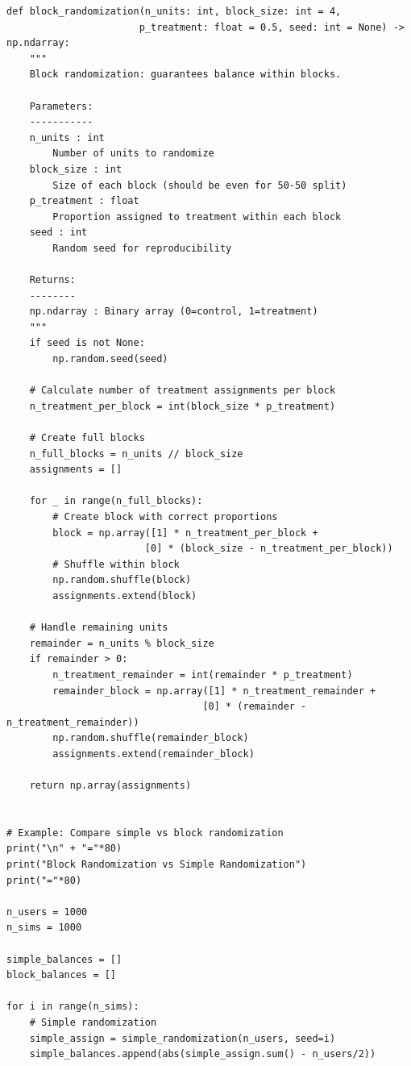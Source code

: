 \lstset{language=Python, caption=Block Randomization Implementation, label=lst:block_random}
\begin{lstlisting}
def block_randomization(n_units: int, block_size: int = 4,
                       p_treatment: float = 0.5, seed: int = None) -> np.ndarray:
    """
    Block randomization: guarantees balance within blocks.

    Parameters:
    -----------
    n_units : int
        Number of units to randomize
    block_size : int
        Size of each block (should be even for 50-50 split)
    p_treatment : float
        Proportion assigned to treatment within each block
    seed : int
        Random seed for reproducibility

    Returns:
    --------
    np.ndarray : Binary array (0=control, 1=treatment)
    """
    if seed is not None:
        np.random.seed(seed)

    # Calculate number of treatment assignments per block
    n_treatment_per_block = int(block_size * p_treatment)

    # Create full blocks
    n_full_blocks = n_units // block_size
    assignments = []

    for _ in range(n_full_blocks):
        # Create block with correct proportions
        block = np.array([1] * n_treatment_per_block +
                        [0] * (block_size - n_treatment_per_block))
        # Shuffle within block
        np.random.shuffle(block)
        assignments.extend(block)

    # Handle remaining units
    remainder = n_units % block_size
    if remainder > 0:
        n_treatment_remainder = int(remainder * p_treatment)
        remainder_block = np.array([1] * n_treatment_remainder +
                                  [0] * (remainder - n_treatment_remainder))
        np.random.shuffle(remainder_block)
        assignments.extend(remainder_block)

    return np.array(assignments)


# Example: Compare simple vs block randomization
print("\n" + "="*80)
print("Block Randomization vs Simple Randomization")
print("="*80)

n_users = 1000
n_sims = 1000

simple_balances = []
block_balances = []

for i in range(n_sims):
    # Simple randomization
    simple_assign = simple_randomization(n_users, seed=i)
    simple_balances.append(abs(simple_assign.sum() - n_users/2))


\end{lstlisting}
